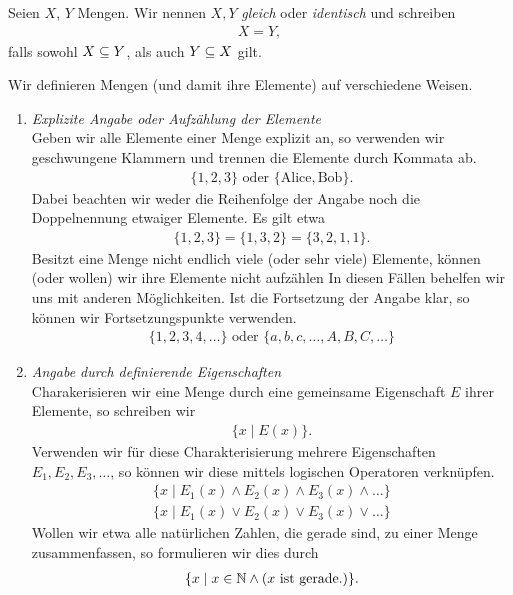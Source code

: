 
\begin{definn}

  Seien $X$, $Y$ Mengen. Wir nennen $X,Y$ \emph{gleich} oder
  \emph{identisch} und schreiben
  \begin{align*}
    X = Y,
  \end{align*}
  falls sowohl $X\subseteq Y$, als auch $Y\subseteq X$ gilt.
\end{definn}


\begin{bspn}

  Wir definieren Mengen (und damit ihre Elemente) auf verschiedene Weisen.
  \begin{enumerate}

    \item \emph{Explizite Angabe oder Aufzählung der Elemente} \\
      Geben wir alle Elemente einer Menge explizit an, so verwenden wir
      geschwungene Klammern und trennen die Elemente durch Kommata ab.
      \begin{align*}
        \{ 1, 2, 3 \} \text{ oder } \{ \text{Alice}, \text{Bob} \}.
      \end{align*}
      Dabei beachten wir weder die Reihenfolge der Angabe noch die
      Doppelnennung etwaiger Elemente. Es gilt etwa
      \begin{align*}
        \{ 1, 2, 3 \} = \{1, 3, 2 \} = \{ 3, 2, 1, 1\}.
      \end{align*}
      Besitzt eine Menge nicht endlich viele (oder sehr viele) Elemente,
      können (oder wollen) wir ihre Elemente nicht aufzählen In diesen
      Fällen behelfen wir uns mit anderen Möglichkeiten. Ist die
      Fortsetzung der Angabe klar, so können wir Fortsetzungspunkte
      verwenden.
      \begin{align*}
        \{ 1, 2, 3, 4, … \} \text{ oder } \{ a, b, c, …, A, B, C, …\}
      \end{align*}
      
    \item \emph{Angabe durch definierende Eigenschaften} \\
      Charakerisieren wir eine Menge durch eine gemeinsame Eigenschaft $E$
      ihrer Elemente, so schreiben wir 
      \begin{align*}
        \{ x \mid E(x) \}.
      \end{align*}
      Verwenden wir für diese Charakterisierung mehrere Eigenschaften
      $E_{1},E_{2},E_{3},…$, so können wir diese mittels logischen
      Operatoren verknüpfen.
      \begin{align*}
        \{ x \mid E_{1}(x) \wedge E_{2}(x) \wedge E_{3}(x) \wedge … \}\\
        \{ x \mid E_{1}(x) \vee E_{2}(x) \vee E_{3}(x) \vee … \}
      \end{align*}
      Wollen wir etwa alle natürlichen Zahlen, die gerade sind, zu einer
      Menge zusammenfassen, so formulieren wir dies durch
      \begin{align*}
        \{ x \mid x\in\mathbb N \wedge (x\text{ ist gerade.}) \}.
      \end{align*}


\end{enumerate}
\end{bspn}
